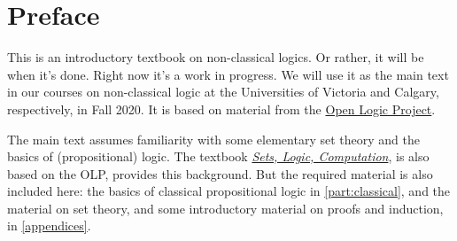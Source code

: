 
\chapter{Preface}

This is an introductory textbook on non-classical logics. Or rather,
it will be when it's done.  Right now it's a work in progress. We will
use it as the main text in our courses on non-classical logic at the
Universities of Victoria and Calgary, respectively, in Fall 2020. It
is based on material from the \href{https://openlogicproject.org}{Open
Logic Project}.

The main text assumes familiarity with some elementary set theory and
the basics of (propositional) logic. The textbook
\href{https://slc.openlogicproject.org}{\emph{Sets, Logic,
Computation}}, is also based on the OLP, provides this background. But
the required material is also included here: the basics of classical
propositional logic in \cref{part:classical}, and the material on set
theory, and some introductory material on proofs and induction, in
\cref{appendices}.
